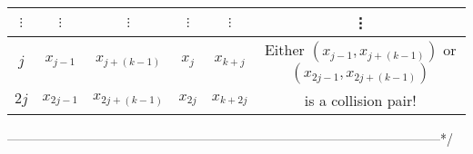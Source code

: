 \documentclass[12pt,openany]{book}
\begin{document}
\begin{tcolorbox}[title=\textbf{Algorithm.}\ Small-Space Attack, coltitle=black, colback=white,colframe=-red, breakable, enhanced]
\begin{enumerate}[$1$:]
{\begin{center}
\begin{tabular}{c||cc|cc||c}
						$\vdots$& $\vdots$& $\vdots$ &$\vdots$&$\vdots$&\vdots\\
						\hline
						{$j$} & $x_{j-1}$& $x_{j+(k-1)}$ &$x_j$&$x_{k+j}$&{Either $(x_{j-1},x_{j+(k-1)})$ or $(x_{2j-1},x_{2j+(k-1)})$}\\
						{$2j$} & $x_{2j-1}$& $x_{2j+(k-1)}$ &$x_{2j}$&$x_{k+2j}$& is a collision pair!\\
						\bottomrule[1.5pt]
					\end{tabular}
				\end{center} ------------------------------------------------------------------------------------------------------*\slash}
		\end{enumerate}
	\end{tcolorbox}
	\fi
\end{document}
